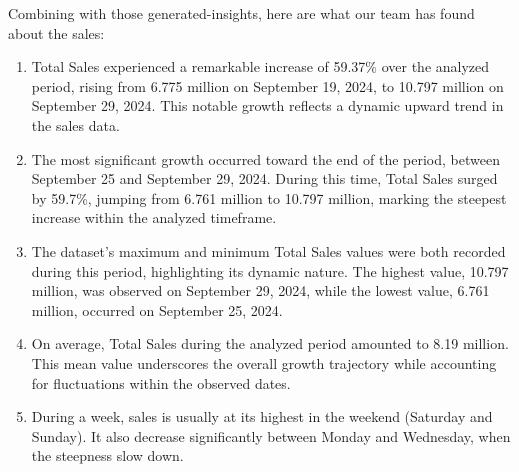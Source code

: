 Combining with those generated-insights, here are what our team has found about the sales:
\begin{enumerate}
    \item Total Sales experienced a remarkable increase of 59.37\% over the analyzed period, rising
    from 6.775 million on September 19, 2024, to 10.797 million on September 29, 2024. This notable
    growth reflects a dynamic upward trend in the sales data.
    \item The most significant growth occurred toward the end of the period, between September 25
    and September 29, 2024. During this time, Total Sales surged by 59.7\%, jumping from 6.761
    million to 10.797 million, marking the steepest increase within the analyzed timeframe.
    \item The dataset's maximum and minimum Total Sales values were both recorded during this
    period, highlighting its dynamic nature. The highest value, 10.797 million, was observed on
    September 29, 2024, while the lowest value, 6.761 million, occurred on September 25, 2024.
    \item On average, Total Sales during the analyzed period amounted to 8.19 million. This mean
    value underscores the overall growth trajectory while accounting for fluctuations within the
    observed dates.
    \item During a week, sales is usually at its highest in the weekend (Saturday and Sunday). It
    also decrease significantly between Monday and Wednesday, when the steepness slow down.
\end{enumerate}
